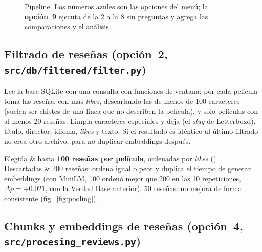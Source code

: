 \documentclass[11pt,a4paper]{article}
\makeatletter
\newcommand{\menu}[1]{\textsf{\textbf{opción~#1}}}
\newenvironment{decision}[1]{\par\smallskip\noindent\tabularx{\linewidth}{@{}>{\bfseries\raggedright}p{2.9cm} >{\raggedright\arraybackslash}X@{}}\toprule}{\bottomrule\endtabularx\par\medskip}
\makeatother
\begin{document}
\begin{figure}[H]
\caption{Pipeline. Los números azules son las opciones del menú; la \menu{9} ejecuta de la 2 a la 8 sin preguntas y
agrega las comparaciones y el análisis.}
\label{fig:pipeline}
\end{figure}

\subsection{Filtrado de reseñas (\menu{2}, \texttt{src/db/filtered/filter.py})}\label{sec:filtrado}

Lee la base SQLite con una consulta con funciones de ventana: por cada película toma las reseñas con más \emph{likes},
descartando las de menos de 100 caracteres (suelen ser chistes de una línea que no describen la película), y solo
películas con al menos 20 reseñas. Limpia caracteres especiales y deja  (el \emph{slug} de
Letterboxd), título, director, idioma, \emph{likes} y texto. Si el resultado es idéntico al último filtrado no crea otro
archivo, para no duplicar embeddings después.

\begin{decision}{}
Elegida & hasta \textbf{100 reseñas por película}, ordenadas por \emph{likes} (). \\
Descartadas & 200 reseñas: ordena igual o peor y duplica el tiempo de generar embeddings (con MiniLM, 100 ordenó mejor
que 200 en las 10 repeticiones, $\Delta\rho=+0.021$, con la Verdad Base anterior). 50 reseñas: no mejora de forma
consistente (fig.~\ref{fig:pooling}). \\
\end{decision}

\subsection{Chunks y embeddings de reseñas (\menu{4}, \texttt{src/procesing\_reviews.py})}
\end{document}
